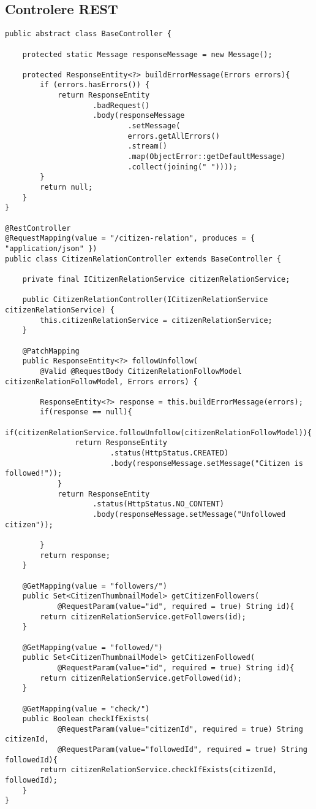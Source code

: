 \subsection{Controlere REST}
\begin {lstlisting}
public abstract class BaseController {

    protected static Message responseMessage = new Message();
    
    protected ResponseEntity<?> buildErrorMessage(Errors errors){
		if (errors.hasErrors()) {
			return ResponseEntity
					.badRequest()
					.body(responseMessage
							.setMessage(
							errors.getAllErrors()
							.stream()
							.map(ObjectError::getDefaultMessage)
							.collect(joining(" "))));
		}
		return null;
    }
}

@RestController
@RequestMapping(value = "/citizen-relation", produces = { "application/json" })
public class CitizenRelationController extends BaseController {

	private final ICitizenRelationService citizenRelationService;

	public CitizenRelationController(ICitizenRelationService citizenRelationService) {
		this.citizenRelationService = citizenRelationService;
	}

	@PatchMapping
	public ResponseEntity<?> followUnfollow(
        @Valid @RequestBody CitizenRelationFollowModel citizenRelationFollowModel, Errors errors) {

		ResponseEntity<?> response = this.buildErrorMessage(errors);
		if(response == null){
			if(citizenRelationService.followUnfollow(citizenRelationFollowModel)){
				return ResponseEntity
						.status(HttpStatus.CREATED)
						.body(responseMessage.setMessage("Citizen is followed!"));
			}
			return ResponseEntity
					.status(HttpStatus.NO_CONTENT)
					.body(responseMessage.setMessage("Unfollowed citizen"));
			
		}
		return response;
	}
	
	@GetMapping(value = "followers/")
    public Set<CitizenThumbnailModel> getCitizenFollowers(
    		@RequestParam(value="id", required = true) String id){
    	return citizenRelationService.getFollowers(id);
    }
	
	@GetMapping(value = "followed/")
    public Set<CitizenThumbnailModel> getCitizenFollowed(
    		@RequestParam(value="id", required = true) String id){
    	return citizenRelationService.getFollowed(id);
    }
	
	@GetMapping(value = "check/")
    public Boolean checkIfExists(
    		@RequestParam(value="citizenId", required = true) String citizenId,
    		@RequestParam(value="followedId", required = true) String followedId){
    	return citizenRelationService.checkIfExists(citizenId, followedId);
    }
}


\end{lstlisting}
